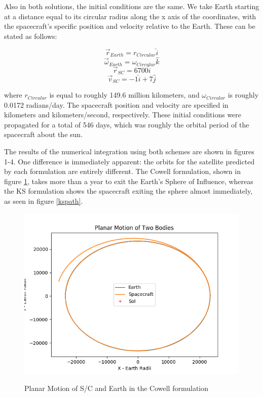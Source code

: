 \documentclass[11pt,twoside,letterpaper]{article}
\begin{document}
  Also in both solutions, the initial conditions are the same. We take
  Earth starting at a distance equal to its circular radius along the
  x axis of the coordinates, with the spacecraft's specific position
  and velocity relative to the Earth. These can be stated as follows:

  \begin{equation} \label{ics}
    \vec{r}_{Earth} = r_{Circular}\hat{i}
  \end{equation}
  \begin{equation}
    \vec{\omega}_{Earth} = \omega_{Circular}\hat{k}
  \end{equation}
  \begin{equation}
    \vec{r}_{SC} = 6700\hat{i}
  \end{equation}
  \begin{equation}
    \vec{v}_{SC} = -1\hat{i} + 7\hat{j}
  \end{equation}

  where \(r_{Circular}\) is equal to roughly 149.6 million kilometers,
  and \(\omega_{Circular}\) is roughly 0.0172 radians/day. The
  spacecraft position and velocity are specified in kilometers and
  kilometers/second, respectively. These initial conditions were
  propagated for a total of 546 days, which was roughly the orbital
  period of the spacecraft about the sun. 

  The results of the numerical integration using both schemes are
  shown in figures 1-4. One difference is immediately apparent: the
  orbits for the satellite predicted by each formulation are entirely
  different. The Cowell formulation, shown in figure \ref{cowPath},
  takes more than a year to exit the Earth's Sphere of Influence,
  whereas the KS formulation shows the spacecraft exiting the sphere
  almost immediately, as seen in figure \ref{kspath}.

  \begin{figure}
    \caption{Planar Motion of S/C and Earth in the Cowell formulation}
    \centering
    \includegraphics[width=\textwidth]{PlanarPath90}
    \label{cowPath}
  \end{figure}
\end{document}
